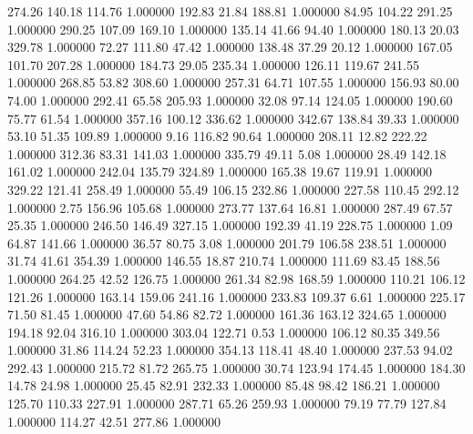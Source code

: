     274.26    140.18    114.76  1.000000
    192.83     21.84    188.81  1.000000
     84.95    104.22    291.25  1.000000
    290.25    107.09    169.10  1.000000
    135.14     41.66     94.40  1.000000
    180.13     20.03    329.78  1.000000
     72.27    111.80     47.42  1.000000
    138.48     37.29     20.12  1.000000
    167.05    101.70    207.28  1.000000
    184.73     29.05    235.34  1.000000
    126.11    119.67    241.55  1.000000
    268.85     53.82    308.60  1.000000
    257.31     64.71    107.55  1.000000
    156.93     80.00     74.00  1.000000
    292.41     65.58    205.93  1.000000
     32.08     97.14    124.05  1.000000
    190.60     75.77     61.54  1.000000
    357.16    100.12    336.62  1.000000
    342.67    138.84     39.33  1.000000
     53.10     51.35    109.89  1.000000
      9.16    116.82     90.64  1.000000
    208.11     12.82    222.22  1.000000
    312.36     83.31    141.03  1.000000
    335.79     49.11      5.08  1.000000
     28.49    142.18    161.02  1.000000
    242.04    135.79    324.89  1.000000
    165.38     19.67    119.91  1.000000
    329.22    121.41    258.49  1.000000
     55.49    106.15    232.86  1.000000
    227.58    110.45    292.12  1.000000
      2.75    156.96    105.68  1.000000
    273.77    137.64     16.81  1.000000
    287.49     67.57     25.35  1.000000
    246.50    146.49    327.15  1.000000
    192.39     41.19    228.75  1.000000
      1.09     64.87    141.66  1.000000
     36.57     80.75      3.08  1.000000
    201.79    106.58    238.51  1.000000
     31.74     41.61    354.39  1.000000
    146.55     18.87    210.74  1.000000
    111.69     83.45    188.56  1.000000
    264.25     42.52    126.75  1.000000
    261.34     82.98    168.59  1.000000
    110.21    106.12    121.26  1.000000
    163.14    159.06    241.16  1.000000
    233.83    109.37      6.61  1.000000
    225.17     71.50     81.45  1.000000
     47.60     54.86     82.72  1.000000
    161.36    163.12    324.65  1.000000
    194.18     92.04    316.10  1.000000
    303.04    122.71      0.53  1.000000
    106.12     80.35    349.56  1.000000
     31.86    114.24     52.23  1.000000
    354.13    118.41     48.40  1.000000
    237.53     94.02    292.43  1.000000
    215.72     81.72    265.75  1.000000
     30.74    123.94    174.45  1.000000
    184.30     14.78     24.98  1.000000
     25.45     82.91    232.33  1.000000
     85.48     98.42    186.21  1.000000
    125.70    110.33    227.91  1.000000
    287.71     65.26    259.93  1.000000
     79.19     77.79    127.84  1.000000
    114.27     42.51    277.86  1.000000
